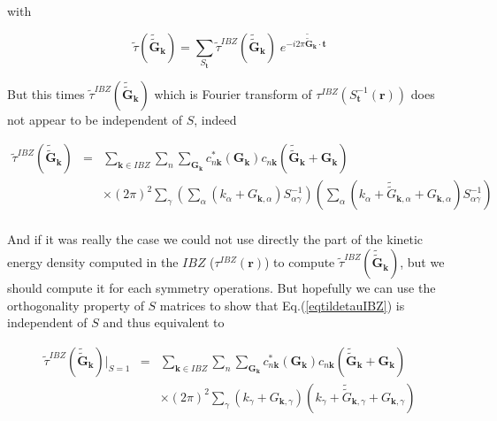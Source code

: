 \documentclass[a4paper,12pt]{report}
\begin{document}
with

\begin{equation}
\tilde{\tau}(\tilde{\tilde{\mathbf{G}}}_{\mathbf{k}}) = \sum_{S_{\mathbf{t}}} \tilde{\tau}^{IBZ}(\tilde{\tilde{\mathbf{G}}}_{\mathbf{k}})\; e^{-i2\pi \tilde{\tilde{\mathbf{G}}}_{\mathbf{k}} \cdot \mathbf{t}}
\end{equation}

But this times $\tilde{\tau}^{IBZ}(\tilde{\tilde{\mathbf{G}}}_{\mathbf{k}})$ which is Fourier transform of $\tau^{IBZ}\left(S_{\mathbf{t}}^{-1}(\mathbf{r})\right)$ does not appear to be independent of $S$, indeed

\begin{eqnarray}
\tilde{\tau}^{IBZ}(\tilde{\tilde{\mathbf{G}}}_{\mathbf{k}}) &=& \sum_{\mathbf{k} \in IBZ} \sum_n \sum_{\mathbf{G}_{\mathbf{k}}} c_{n\mathbf{k}}^{*}(\mathbf{G}_{\mathbf{k}}) c_{n\mathbf{k}}(\tilde{\tilde{\mathbf{G}}}_{\mathbf{k}}+\mathbf{G}_{\mathbf{k}})  \nonumber \\
&&\times  (2\pi)^2 \sum_{\gamma} \left(\sum_{\alpha}\left( k_{\alpha} + G_{\mathbf{k},\alpha}\right) S_{\alpha\gamma}^{-1} \right) \left(\sum_{\alpha}\left( k_{\alpha} + \tilde{\tilde{G}}_{\mathbf{k},\alpha} + G_{\mathbf{k},\alpha}\right) S_{\alpha\gamma}^{-1} \right) \nonumber \\
\label{eqtildetauIBZ}
\end{eqnarray}

And if it was really the case we could not use directly the part of the kinetic energy density computed in the $IBZ$ ($\tau^{IBZ}(\mathbf{r})$) to compute $\tilde{\tau}^{IBZ}(\tilde{\tilde{\mathbf{G}}}_{\mathbf{k}})$, but we should compute it for each symmetry operations. But hopefully we can use the orthogonality property of $S$ matrices to show that Eq.(\ref{eqtildetauIBZ}) is independent of $S$ and thus equivalent to

\begin{eqnarray}
\tilde{\tau}^{IBZ}(\tilde{\tilde{\mathbf{G}}}_{\mathbf{k}})\vert_{S=1} &=& \sum_{\mathbf{k} \in IBZ} \sum_n \sum_{\mathbf{G}_{\mathbf{k}}} c_{n\mathbf{k}}^{*}(\mathbf{G}_{\mathbf{k}}) c_{n\mathbf{k}}(\tilde{\tilde{\mathbf{G}}}_{\mathbf{k}}+\mathbf{G}_{\mathbf{k}})  \nonumber \\
&&\times  (2\pi)^2 \sum_{\gamma} \left( k_{\gamma} + G_{\mathbf{k},\gamma} \right) \left( k_{\gamma} + \tilde{\tilde{G}}_{\mathbf{k},\gamma} + G_{\mathbf{k},\gamma} \right) \label{eqtildetauIBZidentity}
\end{eqnarray}
\end{document}
